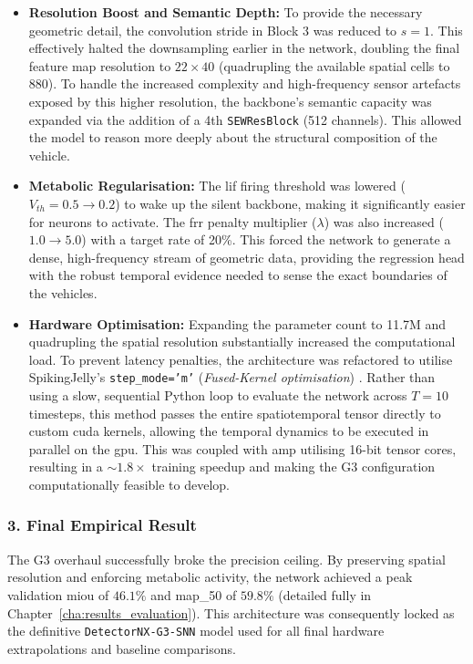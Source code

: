 \begin{itemize}
    \item \textbf{Resolution Boost and Semantic Depth:} To provide the necessary geometric detail, the convolution stride in Block 3 was reduced to $s=1$.
    This effectively halted the downsampling earlier in the network, doubling the final feature map resolution to $22 \times 40$ (quadrupling the available spatial cells to 880).
    To handle the increased complexity and high-frequency sensor artefacts exposed by this higher resolution, the backbone's semantic capacity was expanded via the addition of a 4th \texttt{SEWResBlock} (512 channels). 
    This allowed the model to reason more deeply about the structural composition of the vehicle.
    
    \item \textbf{Metabolic Regularisation:} 
    The \gls{lif} firing threshold was lowered ($V_{th}=0.5 \rightarrow 0.2$) to wake up the silent backbone, making it significantly easier for neurons to activate. 
    The \gls{frr} penalty multiplier ($\lambda$) was also increased ($1.0 \rightarrow 5.0$) with a target rate of 20\%.
    This forced the network to generate a dense, high-frequency stream of geometric data, providing the regression head with the robust temporal evidence needed to sense the exact boundaries of the vehicles.
    
    \item \textbf{Hardware Optimisation:} 
    Expanding the parameter count to 11.7M and quadrupling the spatial resolution substantially increased the computational load. 
    To prevent latency penalties, the architecture was refactored to utilise SpikingJelly's \texttt{step\_mode='m'} (\textit{Fused-Kernel optimisation}) \cite{fang2023spikingjelly}.
    Rather than using a slow, sequential Python loop to evaluate the network across $T=10$ timesteps, this method passes the entire spatiotemporal tensor
    directly to custom \gls{cuda} kernels, allowing the temporal dynamics to be executed in parallel on the \gls{gpu}.
    This was coupled with \gls{amp} utilising 16-bit tensor cores, resulting in a $\sim 1.8\times$ training speedup and making the G3 configuration computationally feasible to develop.
\end{itemize}

\subsubsection*{3. Final Empirical Result}
The G3 overhaul successfully broke the precision ceiling. 
By preserving spatial resolution and enforcing metabolic activity, the network achieved a peak validation \gls{miou} of $46.1\%$ and \gls{map_50} of $59.8\%$ (detailed fully in Chapter~\ref{cha:results_evaluation}).
This architecture was consequently locked as the definitive \texttt{DetectorNX-G3-SNN} model used for all final hardware
extrapolations and baseline comparisons.

